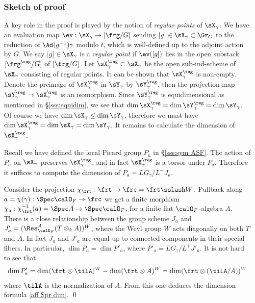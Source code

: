 \subsubsection{Sketch of proof}\label{dim formula discussion} A key role in the proof is played by the notion of {\em regular points} of $\sX_{\gamma}$. We have an evaluation map $\ev: \sX_{\gamma}\to [\frg/G]$ sending $[g]\in\sX_{\gamma}\subset \Gr_{G}$ to the reduction of $\Ad(g^{-1})\gamma$ modulo $t$, which is well-defined up to the adjoint action by $G$.  We say $[g]\in \sX_{\gamma}$ is a {\em regular point} if $\ev([g])$ lies in the open substack $[\frg^{\reg}/G]$ of $[\frg/G]$. Let $\sX^{\reg}_{\gamma}\subset\sX_{\gamma}$ be the open sub-ind-scheme of $\sX_{\gamma}$ consisting of regular points. It can be shown that $\sX^{\reg}_{\gamma}$ is non-empty. Denote the preimage of $\sX^{\reg}_{\gamma}$ in $\sY_{\gamma}$ by $\sY^{\reg}_{\gamma}$, then the projection map $\sY^{\reg}_{\gamma}\to\sX^{\reg}_{\gamma}$ is an isomorphism. Since $\sY^{\reg}_{\gamma}$ is equidimensional as mentioned in \S\ref{sss:equidim}, we see that $\dim\sX^{\reg}_{\gamma}=\dim\sY^{\reg}_{\gamma}=\dim\sY_{\gamma}$. Of course we have $\dim\sX_{\gamma}\leq\dim \sY_{\gamma}$, therefore we must have $\dim \sX^{\reg}_{\gamma}=\dim \sX_{\gamma}=\dim \sY_{\gamma}$. It remains to calculate the dimension of $\sX^{\reg}_{\gamma}$.

Recall we have defined the local Picard group $P_{a}$ in \S\ref{sss:sym ASF}. The action of $P_{a}$ on $\sX_{\gamma}$ preserves $\sX^{\reg}_{\gamma}$, and in fact $\sX^{\reg}_{\gamma}$ is a torsor under $P_{a}$.  Therefore it suffices to compute the dimension of $P_{a}=LG_{\gamma}/L^{+}J_{a}$. 

Consider the projection $\chi_{\frt}: \frt\to\frc=\frt\sslash W$. Pullback along $a=\chi(\gamma):\Spec\calO_{F}\to\frc$ we get a finite morphism $\chi_{a}: \chi^{-1}_{\frt}(a)=\Spec A\to \Spec\calO_{F}$, for a finite flat $\calO_{F}$-algebra $A$. There is a close relationship between the group scheme $J_{a}$ and $J'_{a}=(\Res^{A}_{\calO_{F}}(T\otimes_{k}A))^{W}$, where the Weyl group $W$ acts diagonally on both $T$ and $A$.  In fact $J_{a}$ and $J'_{a}$ are equal up to connected components in their special fibers. In particular, $\dim P_{a}=\dim P'_{a}$, where $P'_{a}=LG_{\gamma}/L^{+}J'_{a}$. It is not hard to see that
\begin{equation*}
\dim P'_{a}=\dim (\frt\otimes \tilA)^{W}-\dim (\frt\otimes A)^{W}=\dim (\frt\otimes (\tilA/A))^{W}
\end{equation*}
where $\tilA$ is the normalization of $A$. From this one deduces the dimension formula \eqref{aff Spr dim}. \qed

